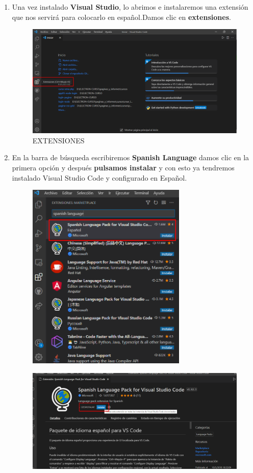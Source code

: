 \begin{enumerate}
\item Una vez instalado \textbf{Visual Studio}, lo abrimos e instalaremos una extensión que nos servirá para colocarlo en español.Damos clic en \textbf{extensiones}.
\begin{figure}[H]
    \centering
    \includegraphics[width = 16 cm]{img/extensioncode.png}
    \caption{EXTENSIONES}
\end{figure}
\newpage
\item En la barra de búsqueda escribiremos \textbf{Spanish Language} damos clic en la primera opción y después \textbf{pulsamos instalar} y con esto ya tendremos instalado Visual Studio Code y configurado en Español.
\begin{figure}[H]
    \centering
    \includegraphics[width = 10 cm, height = 9cm]{img/final extension.png}
\end{figure}

\begin{figure}[H]
    \centering
    \includegraphics[width = 16 cm]{img/instalarexten.png}
\end{figure}
\end{enumerate}
